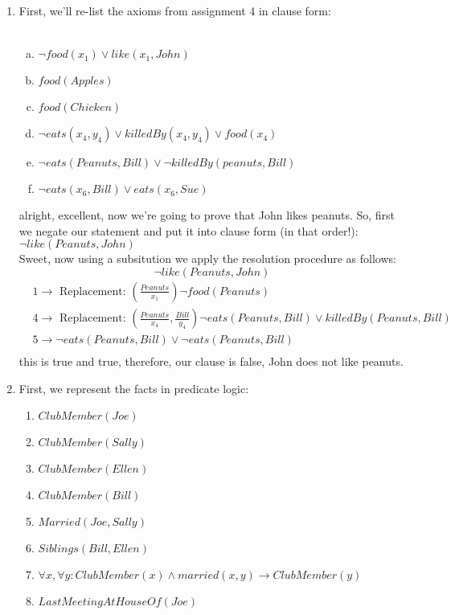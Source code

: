 \documentclass[11pt]{article}
\begin{document}
\vspace{.25cm}
\begin{enumerate}
\item First, we'll re-list the axioms from assignment 4 in clause form: \\\\
\begin{enumerate}[(a)]
\item $\neg food(x_1) \vee like(x_1, John)$
\item $food(Apples)$
\item $food(Chicken)$
\item $\neg eats(x_4, y_4) \vee killedBy(x_4, y_4) \vee food(x_4)$
\item $\neg eats(Peanuts, Bill) \vee \neg killedBy(peanuts, Bill)$
\item $\neg eats(x_6, Bill) \vee eats(x_6, Sue)$
\end{enumerate}
alright, excellent, now we're going to prove that John likes peanuts. So, first we negate our statement and put it into clause form (in that order!): $\neg like(Peanuts, John)$\\
Sweet, now using a subsitution we apply the resolution procedure as follows: 
$$\neg like(Peanuts, John)$$
\begin{align*}
&1 \rightarrow \text{ Replacement: } \left ( \frac{Peanuts}{x_1} \right ) \neg food(Peanuts)\\
&4 \rightarrow \text{ Replacement: } \left ( \frac{Peanuts}{x_4}, \frac{Bill}{y_4} \right )  \neg eats(Peanuts, Bill) \vee killedBy(Peanuts, Bill)\\
&5 \rightarrow   \neg eats(Peanuts, Bill) \vee \neg eats(Peanuts, Bill)\\
\end{align*}
this is true and true, therefore, our clause is false, John does not like peanuts. 
\item First, we represent the facts in predicate logic: 
\begin{enumerate}[(1)]
\item $ClubMember(Joe)$
\item $ClubMember(Sally)$
\item $ClubMember(Ellen)$
\item $ClubMember(Bill)$
\item $Married(Joe, Sally)$
\item $Siblings(Bill, Ellen)$
\item $\forall x, \forall y: ClubMember(x) \wedge married(x, y) \rightarrow ClubMember(y)$
\item $LastMeetingAtHouseOf(Joe)$ 

\end{enumerate}
\end{enumerate}
\end{document}
